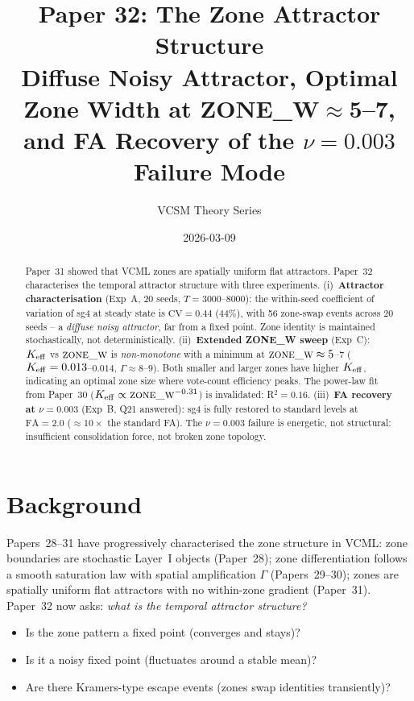 \documentclass[11pt,a4paper]{article}
\title{\textbf{Paper 32: The Zone Attractor Structure}\\
\large Diffuse Noisy Attractor, Optimal Zone Width at ZONE\_W$\approx$5--7,\\
and FA Recovery of the $\nu=0.003$ Failure Mode}
\author{VCSM Theory Series}
\date{2026-03-09}
\begin{document}
\maketitle

\begin{abstract}
Paper~31 showed that VCML zones are spatially uniform flat attractors.  Paper~32
characterises the temporal attractor structure with three experiments.
(i)~\textbf{Attractor characterisation} (Exp~A, 20 seeds, $T=3000$--$8000$):
the within-seed coefficient of variation of sg4 at steady state is $\mathrm{CV}=0.44$
(44\%), with 56 zone-swap events across 20 seeds -- a \emph{diffuse noisy attractor},
far from a fixed point.  Zone identity is maintained stochastically, not deterministically.
(ii)~\textbf{Extended ZONE\_W sweep} (Exp~C): $K_{\rm eff}$ vs $\textsc{zone\_w}$ is
\emph{non-monotone} with a minimum at $\textsc{zone\_w}\approx 5$--$7$
($K_{\rm eff}=0.013$--$0.014$, $\Gamma\approx 8$--$9$).  Both smaller and larger zones
have higher $K_{\rm eff}$, indicating an optimal zone size where vote-count efficiency
peaks.  The power-law fit from Paper~30 ($K_{\rm eff}\propto\textsc{zone\_w}^{-0.31}$)
is invalidated: R$^2=0.16$.
(iii)~\textbf{FA recovery at $\nu=0.003$} (Exp~B, Q21 answered): sg4 is fully restored
to standard levels at $\mathrm{FA}=2.0$ ($\approx10\times$ the standard FA).  The
$\nu=0.003$ failure is energetic, not structural: insufficient consolidation force, not
broken zone topology.
\end{abstract}

\section{Background}
\label{sec:background}

Papers~28--31 have progressively characterised the zone structure in VCML:
zone boundaries are stochastic Layer~I objects (Paper~28); zone differentiation follows
a smooth saturation law with spatial amplification $\Gamma$ (Papers~29--30); zones are
spatially uniform flat attractors with no within-zone gradient (Paper~31).
Paper~32 now asks: \emph{what is the temporal attractor structure?}

\begin{itemize}
  \item Is the zone pattern a fixed point (converges and stays)?
  \item Is it a noisy fixed point (fluctuates around a stable mean)?
  \item Are there Kramers-type escape events (zones swap identities transiently)?
\end{itemize}
\end{document}

